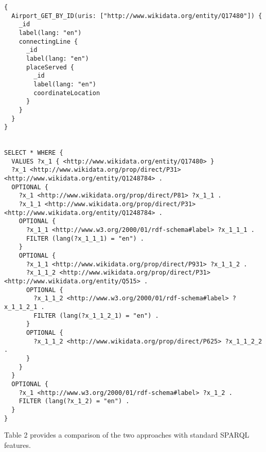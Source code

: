 \begin{minipage}{\linewidth}
\begin{lstlisting}[label=listing:listing44, caption={Query 4 - HyperGraphQL}]
{
  Airport_GET_BY_ID(uris: ["http://www.wikidata.org/entity/Q17480"]) {
    _id
    label(lang: "en")
    connectingLine {
      _id
      label(lang: "en")
      placeServed {
        _id
        label(lang: "en")
        coordinateLocation
      }
    }
  }
} 


SELECT * WHERE {
  VALUES ?x_1 { <http://www.wikidata.org/entity/Q17480> }
  ?x_1 <http://www.wikidata.org/prop/direct/P31> <http://www.wikidata.org/entity/Q1248784> .
  OPTIONAL {
    ?x_1 <http://www.wikidata.org/prop/direct/P81> ?x_1_1 .
    ?x_1_1 <http://www.wikidata.org/prop/direct/P31> <http://www.wikidata.org/entity/Q1248784> .
    OPTIONAL {
      ?x_1_1 <http://www.w3.org/2000/01/rdf-schema#label> ?x_1_1_1 .
      FILTER (lang(?x_1_1_1) = "en") .
    }
    OPTIONAL {
      ?x_1_1 <http://www.wikidata.org/prop/direct/P931> ?x_1_1_2 .
      ?x_1_1_2 <http://www.wikidata.org/prop/direct/P31> <http://www.wikidata.org/entity/Q515> .
      OPTIONAL {
        ?x_1_1_2 <http://www.w3.org/2000/01/rdf-schema#label> ?x_1_1_2_1 .
        FILTER (lang(?x_1_1_2_1) = "en") .
      }
      OPTIONAL {
        ?x_1_1_2 <http://www.wikidata.org/prop/direct/P625> ?x_1_1_2_2 .
      }
    }
  }
  OPTIONAL {
    ?x_1 <http://www.w3.org/2000/01/rdf-schema#label> ?x_1_2 .
    FILTER (lang(?x_1_2) = "en") .
  }
}

\end{lstlisting}
\end{minipage}


Table 2 provides a comparison of the two approaches with standard SPARQL features.

